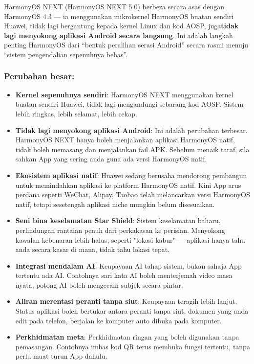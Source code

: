 HarmonyOS NEXT (HarmonyOS NEXT 5.0) berbeza secara asas dengan HarmonyOS 4.3 — ia menggunakan mikrokernel HarmonyOS buatan sendiri Huawei, tidak lagi bergantung kepada kernel Linux dan kod AOSP, juga\textbf{tidak lagi menyokong aplikasi Android secara langsung}. Ini adalah langkah penting HarmonyOS dari “bentuk peralihan serasi Android” secara rasmi menuju “sistem pengendalian sepenuhnya bebas”.

\subsubsection*{Perubahan besar:}

\begin{itemize}
  \item \textbf{Kernel sepenuhnya sendiri}: HarmonyOS NEXT menggunakan kernel buatan sendiri Huawei, tidak lagi mengandungi sebarang kod AOSP. Sistem lebih ringkas, lebih selamat, lebih cekap.
  \item \textbf{Tidak lagi menyokong aplikasi Android}: Ini adalah perubahan terbesar. HarmonyOS NEXT hanya boleh menjalankan aplikasi HarmonyOS natif, tidak boleh memasang dan menjalankan fail APK. Sebelum menaik taraf, sila sahkan App yang sering anda guna ada versi HarmonyOS natif.
  \item \textbf{Ekosistem aplikasi natif}: Huawei sedang berusaha mendorong pembangun untuk memindahkan aplikasi ke platform HarmonyOS natif. Kini App arus perdana seperti WeChat, Alipay, Taobao telah melancarkan versi HarmonyOS natif, tetapi sesetengah aplikasi niche mungkin belum disesuaikan.
  \item \textbf{Seni bina keselamatan Star Shield}: Sistem keselamatan baharu, perlindungan rantaian penuh dari perkakasan ke perisian. Menyokong kawalan kebenaran lebih halus, seperti "lokasi kabur" — aplikasi hanya tahu anda secara kasar di mana, tidak tahu lokasi tepat.
  \item \textbf{Integrasi mendalam AI}: Keupayaan AI tahap sistem, bukan sahaja App tertentu ada AI. Contohnya sari kata AI boleh menterjemah video masa nyata, potong AI boleh mengecam subjek secara pintar.
  \item \textbf{Aliran merentasi peranti tanpa siut}: Keupayaan teragih lebih lanjut. Status aplikasi boleh bertukar antara peranti tanpa siut, dokumen yang anda edit pada telefon, berjalan ke komputer auto dibuka pada komputer.
  \item \textbf{Perkhidmatan meta}: Perkhidmatan ringan yang boleh digunakan tanpa pemasangan. Contohnya imbas kod QR terus membuka fungsi tertentu, tanpa perlu muat turun App dahulu.
\end{itemize}

